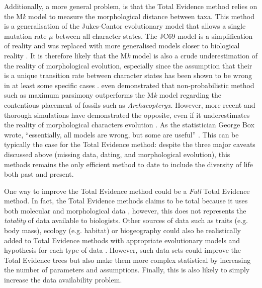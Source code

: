 Additionally, a more general problem, is that the Total Evidence method relies on the M\textit{k} model \citep{lewisa2001} to measure the morphological distance between taxa.
This method is a generalisation of the Jukes-Cantor evolutionary model \citep[JC69;][]{jukes1969evolution} that allows a single mutation rate $\mu$ between all character states.
The JC69 model is a simplification of reality and was replaced with more generalised models closer to biological reality \citep[e.g. the GTR model allowing a different rate for each mutation;][]{tavare1986}.
It is therefore likely that the M\textit{k} model is also a crude underestimation of the reality of morphological evolution, especially since the assumption that their is a unique transition rate between character states has been shown to be wrong in at least some specific cases \citep[e.g. for Dollo traits that are traits that have been observed to evolve from only one state \textit{a} to \textit{b} but never from \textit{b} to \textit{a};][]{WrightDollo}.
\cite{spencerefficacy2013} even demonstrated that non-probabilistic method such as maximum parsimony outperforms the M\textit{k} model regarding the contentious placement of fossils such as \textit{Archaeopteryx}.
However, more recent and thorough simulations have demonstrated the opposite, even if it underestimates the reality of morphological characters evolution \citep{wrightbayesian2014}.
As the statistician George Box wrote, ``essentially, all models are wrong, but some are useful'' \citep{box1987empirical}.
This can be typically the case for the Total Evidence method: despite the three major caveats discussed above (missing data, dating, and morphological evolution), this methods remains the only efficient method to date to include the diversity of life both past and present.

One way to improve the Total Evidence method could be a \textit{Full} Total Evidence method.
In fact, the Total Evidence methods claims to be total because it uses both molecular and morphological data \citep{eernissetaxonomic1993}, however, this does not represents the \textit{totality} of data available to biologists.
Other sources of data such as traits (e.g. body mass), ecology (e.g. habitat) or biogeography could also be realistically added to Total Evidence methods with appropriate evolutionary models and hypothesis for each type of data \citep[e.g. respectively quantitative, multiple or geographic state speciation and extinction model -- Qua-Mu-GeoSSE models;][]{fitzjohndiversitree2012}.
However, such data sets could improve the Total Evidence trees but also make them more complex statistical by increasing the number of parameters and assumptions.
Finally, this is also likely to simply increase the data availability problem.

